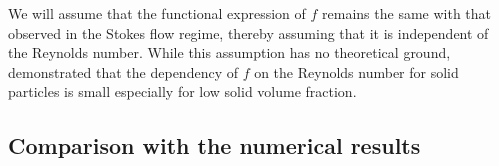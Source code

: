 








We will assume that the functional expression of $f$ remains the same with that observed in the Stokes flow regime, thereby assuming that it is independent of the Reynolds number. While this assumption has no theoretical ground, \citet{di1994} demonstrated that the dependency of $f$ on the Reynolds number for solid particles is small especially for low solid volume fraction.





\subsection{Comparison with the numerical results}


